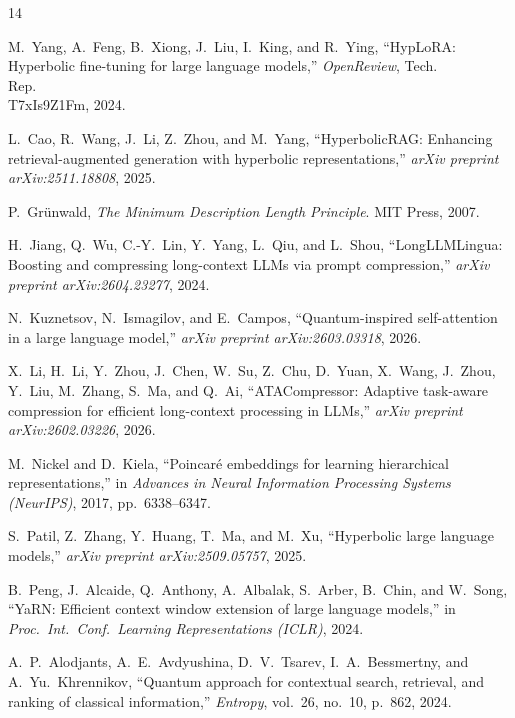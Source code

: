 \documentclass[a4paper,11pt]{ctexart}
\begin{document}
\begin{thebibliography}{14}

M.~Yang, A.~Feng, B.~Xiong, J.~Liu, I.~King, and R.~Ying,
``HypLoRA: Hyperbolic fine-tuning for large language models,''
\emph{OpenReview}, Tech.\\ Rep.\\ T7xIs9Z1Fm, 2024.

L.~Cao, R.~Wang, J.~Li, Z.~Zhou, and M.~Yang,
``HyperbolicRAG: Enhancing retrieval-augmented generation with
hyperbolic representations,''
\emph{arXiv preprint arXiv:2511.18808}, 2025.

P.~Gr\"{u}nwald,
\emph{The Minimum Description Length Principle}.
MIT Press, 2007.

H.~Jiang, Q.~Wu, C.-Y.~Lin, Y.~Yang, L.~Qiu, and L.~Shou,
``LongLLMLingua: Boosting and compressing long-context {LLMs} via prompt
compression,''
\emph{arXiv preprint arXiv:2604.23277}, 2024.

N.~Kuznetsov, N.~Ismagilov, and E.~Campos,
``Quantum-inspired self-attention in a large language model,''
\emph{arXiv preprint arXiv:2603.03318}, 2026.

X.~Li, H.~Li, Y.~Zhou, J.~Chen, W.~Su, Z.~Chu, D.~Yuan, X.~Wang,
J.~Zhou, Y.~Liu, M.~Zhang, S.~Ma, and Q.~Ai,
``{ATACompressor}: Adaptive task-aware compression for efficient
long-context processing in {LLMs},''
\emph{arXiv preprint arXiv:2602.03226}, 2026.

M.~Nickel and D.~Kiela,
``Poincar\'{e} embeddings for learning hierarchical representations,''
in \emph{Advances in Neural Information Processing Systems (NeurIPS)},
2017, pp.~6338--6347.

S.~Patil, Z.~Zhang, Y.~Huang, T.~Ma, and M.~Xu,
``Hyperbolic large language models,''
\emph{arXiv preprint arXiv:2509.05757}, 2025.

B.~Peng, J.~Alcaide, Q.~Anthony, A.~Albalak, S.~Arber, B.~Chin,
and W.~Song,
``{YaRN}: Efficient context window extension of large language models,''
in \emph{Proc.\ Int.\ Conf.\ Learning Representations (ICLR)}, 2024.

A.~P.~Alodjants, A.~E.~Avdyushina, D.~V.~Tsarev, I.~A.~Bessmertny,
and A.~Yu.~Khrennikov,
``Quantum approach for contextual search, retrieval, and ranking of
classical information,''
\emph{Entropy}, vol.~26, no.~10, p.~862, 2024.


\end{thebibliography}
\end{document}
